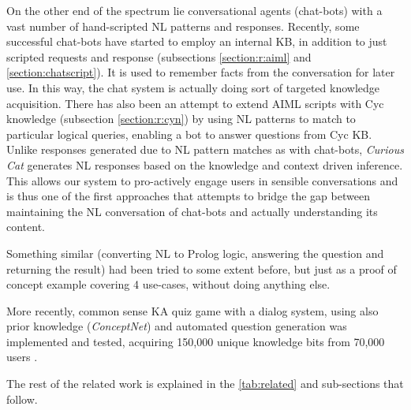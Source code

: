 On the other end of the spectrum lie conversational agents (chat-bots) with a 
vast number of hand-scripted NL patterns and responses.
Recently, some successful chat-bots have started to employ an internal KB, in
addition to just scripted requests and response (subsections 
\ref{section:r:aiml} and \ref{section:chatscript}). It is used to remember facts 
from the conversation for later use. In this way, the chat system is actually 
doing sort of targeted knowledge acquisition. There has also been an attempt to 
extend AIML scripts with Cyc knowledge (subsection \ref{section:r:cyn}) by 
using NL patterns to match to particular logical queries, enabling a bot to 
answer questions from Cyc KB. Unlike responses generated due to NL pattern 
matches as with chat-bots, \emph{Curious Cat} generates NL responses based on 
the knowledge and context driven inference. This allows our system to 
pro-actively engage users in sensible conversations and is thus one of the first 
approaches that attempts to bridge the gap between maintaining the NL 
conversation of chat-bots and actually understanding its content.

Something similar (converting NL to Prolog logic, answering the question and
returning the result) had been tried to some extent before\parencite{Baral2007},
but just as a proof of concept example covering 4 use-cases, without doing 
anything else.

More recently, common sense KA quiz game with a dialog system, using also prior
knowledge (\emph{ConceptNet}) and automated question generation was implemented 
and tested, acquiring 150,000 unique knowledge bits from 70,000 users
\parencite{Otani2016}. 

The rest of the related work is explained in the \autoref{tab:related} and 
sub-sections that follow.

